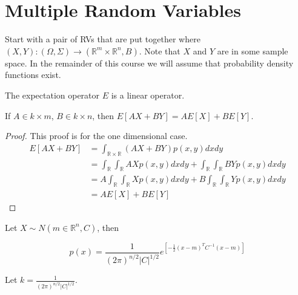 \mainmatter%
\setcounter{page}{1}

\lectureseries[\course]{\course}

\date{October 1, 2009}

\setaddress%

\setcounter{lecture}{1}
\setcounter{chapter}{1}


\section{Multiple Random Variables}
Start with a pair of RVs that are put together where $(X,Y):(\Omega,\Sigma) \to (\mathbb{R}^m\times \mathbb{R}^n,B)$.
Note that $X$ and $Y$ are in some sample space.
In the remainder of this course we will assume that probability density functions exist.

\begin{theorem}%
\label{th:02expectationlo}
The expectation operator $E$ is a linear operator.

If $A\in k\times m$, $B\in k\times n$, then $E[AX+BY]=AE[X]+BE[Y]$.
\end{theorem}
\begin{proof}
This proof is for the one dimensional case.
\begin{align*}
E[AX+BY] &= \int_{\mathbb{R}\times\mathbb{R}}(AX+BY)p(x,y)dxdy \\
&= \int_{\mathbb{R}}\int_{\mathbb{R}}AXp(x,y)dxdy + \int_{\mathbb{R}}\int_{\mathbb{R}}BYp(x,y)dxdy \\
&= A\int_{\mathbb{R}}\int_{\mathbb{R}}Xp(x,y)dxdy + B\int_{\mathbb{R}}\int_{\mathbb{R}}Yp(x,y)dxdy \\
&= AE[X] + BE[Y]
\end{align*}
\end{proof}

Let $X\sim N(m\in\mathbb{R}^n,C)$, then

\begin{equation*}
p(x)=\frac{1}{{(2\pi)}^{n/2}|C|^{1/2}}e^{\left[-\frac{1}{2}{(x-m)}^T C^{-1}(x-m)\right]}
\end{equation*}

Let $k=\frac{1}{{(2\pi)}^{n/2}|C|^{1/2}}$.

